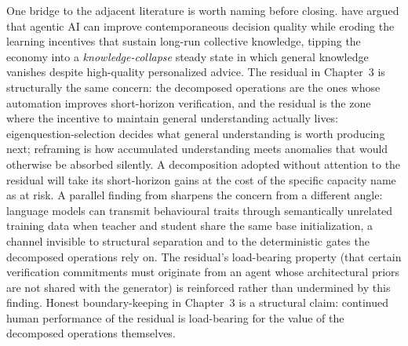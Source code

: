 \documentclass[11pt]{article}
\begin{document}
One bridge to the adjacent literature is worth naming before closing. \citet{acemoglu2026} have argued that agentic AI can improve contemporaneous decision quality while eroding the learning incentives that sustain long-run collective knowledge, tipping the economy into a \emph{knowledge-collapse} steady state in which general knowledge vanishes despite high-quality personalized advice. The residual in Chapter~3 is structurally the same concern: the decomposed operations are the ones whose automation improves short-horizon verification, and the residual is the zone where the incentive to maintain general understanding actually lives: eigenquestion-selection decides what general understanding is worth producing next; reframing is how accumulated understanding meets anomalies that would otherwise be absorbed silently. A decomposition adopted without attention to the residual will take its short-horizon gains at the cost of the specific capacity \citeauthor{acemoglu2026} name as at risk. A parallel finding from \citet{cloud2026} sharpens the concern from a different angle: language models can transmit behavioural traits through semantically unrelated training data when teacher and student share the same base initialization, a channel invisible to structural separation and to the deterministic gates the decomposed operations rely on. The residual's load-bearing property (that certain verification commitments must originate from an agent whose architectural priors are not shared with the generator) is reinforced rather than undermined by this finding. Honest boundary-keeping in Chapter~3 is a structural claim: continued human performance of the residual is load-bearing for the value of the decomposed operations themselves.
\end{document}

